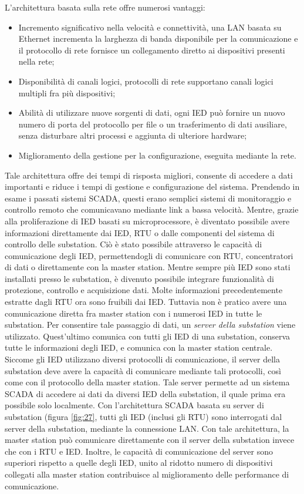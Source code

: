 L'architettura basata sulla rete offre numerosi vantaggi:
\begin{itemize}
	\item Incremento significativo nella velocità e connettività, una LAN basata su Ethernet incrementa la larghezza di banda disponibile per la comunicazione e il protocollo di rete fornisce un collegamento diretto ai dispositivi presenti nella rete;
	\item Disponibilità di canali logici, protocolli di rete supportano canali logici multipli fra più dispositivi;
	\item Abilità di utilizzare nuove sorgenti di dati, ogni IED può fornire un nuovo numero di porta del protocollo per file o un trasferimento di dati ausiliare, senza disturbare altri processi e aggiunta di ulteriore hardware;
	\item Miglioramento della gestione per la configurazione, eseguita mediante la rete.
\end{itemize}
Tale architettura offre dei tempi di risposta migliori, consente di accedere a dati importanti e riduce i tempi di gestione e configurazione del sistema. Prendendo in esame i passati sistemi SCADA, questi erano semplici sistemi di monitoraggio e controllo remoto che comunicavano mediante link a bassa velocità. Mentre, grazie alla proliferazione di IED basati su microprocessore, è diventato possibile avere informazioni direttamente dai IED, RTU o dalle componenti del sistema di controllo delle substation. Ciò è stato possibile attraverso le capacità di comunicazione degli IED, permettendogli di comunicare con RTU, concentratori di dati o direttamente con la master station. Mentre sempre più IED sono stati installati presso le substation, è divenuto possibile integrare funzionalità di protezione, controllo e acquisizione dati. Molte informazioni precedentemente estratte dagli RTU ora sono fruibili dai IED. Tuttavia non è pratico avere una comunicazione diretta fra master station con i numerosi IED in tutte le substation. Per consentire tale passaggio di dati, un \emph{server della substation} viene utilizzato. Quest'ultimo comunica con tutti gli IED di una substation, conserva tutte le informazioni degli IED, e comunica con la master station centrale. Siccome gli IED utilizzano diversi protocolli di comunicazione, il server della substation deve avere la capacità di comunicare mediante tali protocolli, così come con il protocollo della master station. Tale server permette ad un sistema SCADA di accedere ai dati da diversi IED della substation, il quale prima era possibile solo localmente.
\newline
Con l'architettura SCADA basata su server di substation (figura \ref{fig:27}, tutti gli IED (inclusi gli RTU) sono interrogati dal server della substation, mediante la connessione LAN. Con tale architettura, la master station può comunicare direttamente con il server della substation invece che con i RTU e IED. Inoltre, le capacità di comunicazione del server sono superiori rispetto a quelle degli IED, unito al ridotto numero di dispositivi collegati alla master station contribuisce al miglioramento delle performance di comunicazione.

